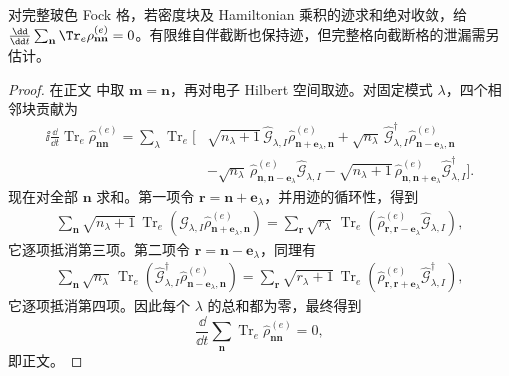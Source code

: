 \begin{proposition}
对完整玻色 Fock 格，若密度块及 Hamiltonian 乘积的迹求和绝对收敛，给 $\frac{\dd}{\dd t}\sum_{\mathbf n}\Tr_e\rho^{(e)}_{\mathbf n\mathbf n}=0$。有限维自伴截断也保持迹，但完整格向截断格的泄漏需另估计。
\end{proposition}
\begin{proof}
在正文 中取 $\mathbf m=\mathbf n$，再对电子 Hilbert 空间取迹。对固定模式 $\lambda$，四个相邻块贡献为
\begin{align*}
\ii\frac{\dd}{\dd t}
\operatorname{Tr}_e\hat\rho^{(e)}_{\mathbf n\mathbf n}
=\sum_\lambda\operatorname{Tr}_e\Big[&
\sqrt{n_\lambda+1}\,
\hat{\mathcal G}_{\lambda,I}
\hat\rho^{(e)}_{\mathbf n+\mathbf e_\lambda,\mathbf n}
+\sqrt{n_\lambda}\,
\hat{\mathcal G}_{\lambda,I}^\dagger
\hat\rho^{(e)}_{\mathbf n-\mathbf e_\lambda,\mathbf n}\\
&-\sqrt{n_\lambda}\,
\hat\rho^{(e)}_{\mathbf n,\mathbf n-\mathbf e_\lambda}
\hat{\mathcal G}_{\lambda,I}
-\sqrt{n_\lambda+1}\,
\hat\rho^{(e)}_{\mathbf n,\mathbf n+\mathbf e_\lambda}
\hat{\mathcal G}_{\lambda,I}^\dagger
\Big].
\end{align*}
现在对全部 $\mathbf n$ 求和。第一项令 $\mathbf r=\mathbf n+\mathbf e_\lambda$，并用迹的循环性，得到
\begin{align*}
\sum_{\mathbf n}\sqrt{n_\lambda+1}\,
\operatorname{Tr}_e\!\left(
\hat{\mathcal G}_{\lambda,I}
\hat\rho^{(e)}_{\mathbf n+\mathbf e_\lambda,\mathbf n}
\right)
=\sum_{\mathbf r}\sqrt{r_\lambda}\,
\operatorname{Tr}_e\!\left(
\hat\rho^{(e)}_{\mathbf r,\mathbf r-\mathbf e_\lambda}
\hat{\mathcal G}_{\lambda,I}
\right),
\end{align*}
它逐项抵消第三项。第二项令 $\mathbf r=\mathbf n-\mathbf e_\lambda$，同理有
\begin{align*}
\sum_{\mathbf n}\sqrt{n_\lambda}\,
\operatorname{Tr}_e\!\left(
\hat{\mathcal G}_{\lambda,I}^\dagger
\hat\rho^{(e)}_{\mathbf n-\mathbf e_\lambda,\mathbf n}
\right)
=\sum_{\mathbf r}\sqrt{r_\lambda+1}\,
\operatorname{Tr}_e\!\left(
\hat\rho^{(e)}_{\mathbf r,\mathbf r+\mathbf e_\lambda}
\hat{\mathcal G}_{\lambda,I}^\dagger
\right),
\end{align*}
它逐项抵消第四项。因此每个 $\lambda$ 的总和都为零，最终得到
\[
\frac{\dd}{\dd t}\sum_{\mathbf n}\operatorname{Tr}_e
\hat\rho^{(e)}_{\mathbf n\mathbf n}=0,
\]
即正文。
\end{proof}


